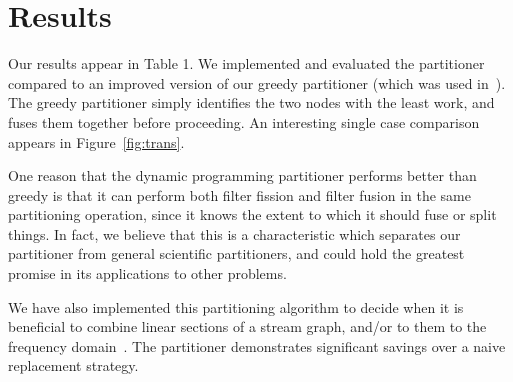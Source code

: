 \section{Results}
\label{sec:results}

Our results appear in Table 1.  We implemented and evaluated the
partitioner compared to an improved version of our greedy partitioner
(which was used in~\cite{streamit-asplos}).  The greedy partitioner
simply identifies the two nodes with the least work, and fuses them
together before proceeding.  An interesting single case comparison
appears in Figure~\ref{fig:trans}.  

One reason that the dynamic programming partitioner performs better
than greedy is that it can perform both filter fission and filter
fusion in the same partitioning operation, since it knows the extent
to which it should fuse or split things.  In fact, we believe that
this is a characteristic which separates our partitioner from general
scientific partitioners, and could hold the greatest promise in its
applications to other problems.

We have also implemented this partitioning algorithm to decide when it
is beneficial to combine linear sections of a stream graph, and/or to
them to the frequency domain~\cite{lamb03}.  The partitioner
demonstrates significant savings over a naive replacement strategy.


